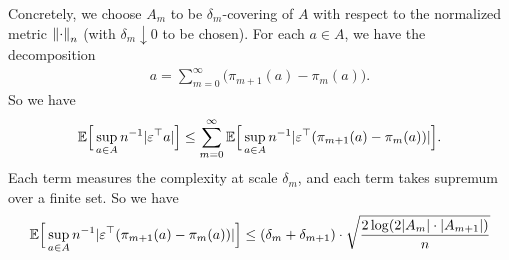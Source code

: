 \documentclass[11pt,letterpaper]{article}
\numberwithin{theorem}{lecture}
\numberwithin{proposition}{lecture}
\numberwithin{lemma}{lecture}
\numberwithin{claim}{lecture}
\numberwithin{corollary}{lecture}
\numberwithin{definition}{lecture}
\numberwithin{conjecture}{lecture}
\numberwithin{remark}{lecture}
\numberwithin{example}{lecture}
\numberwithin{equation}{lecture}
\begin{document}
Concretely, we choose $A_m$ to be $\delta_m$-covering of $A$ with respect to the normalized metric $\left\| \cdot\right\|_{n}$ (with $\delta_m \downarrow 0$ to be chosen). For each $a \in A$, we have the decomposition
\begin{align*}
  a = \sum_{m = 0}^\infty \big( \pi_{m + 1} (a) - \pi_{m } (a) \big).
\end{align*}
So we have
\begin{align*}
  {\mathbb{E}} \Big[ \sup_{a \in A} n^{-1} |\varepsilon^\top a| \Big] \leq \sum_{m = 0}^\infty {\mathbb{E}} \Big[ \sup_{a \in A} n^{-1} |\varepsilon^\top (\pi_{m + 1} (a) - \pi_m (a))| \Big].
\end{align*}
Each term measures the complexity at scale $\delta_m$, and each term takes supremum over a finite set. So we have
\begin{align*}
  {\mathbb{E}} \Big[ \sup_{a \in A} n^{-1} |\varepsilon^\top (\pi_{m + 1} (a) - \pi_m (a))| \Big] \leq (\delta_m + \delta_{m + 1}) \cdot \sqrt{\frac{2 \log (2 |A_m| \cdot |A_{m + 1}|)}{n}}
\end{align*}
\end{document}

